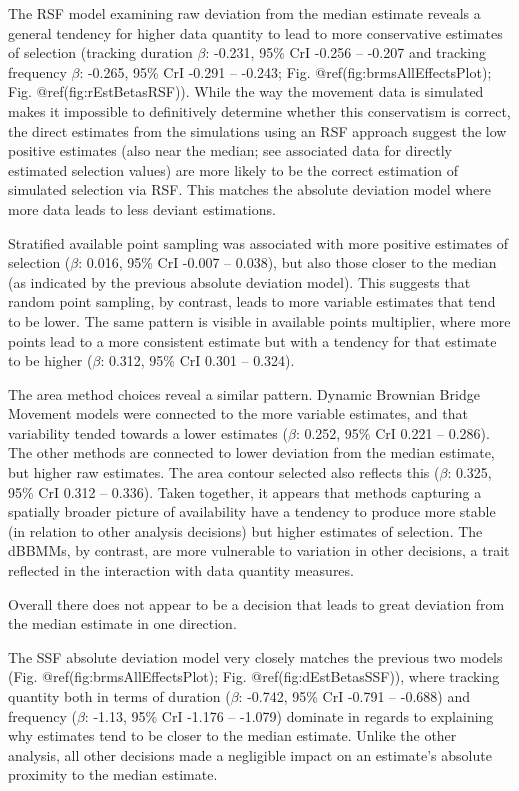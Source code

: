 \documentclass[10pt,a4paper]{article}
\begin{document}
The RSF model examining raw deviation from the median estimate reveals a general tendency for higher data quantity to lead to more conservative estimates of selection (tracking duration \(\beta\): -0.231, 95\% CrI -0.256 -- -0.207 and tracking frequency \(\beta\): -0.265, 95\% CrI -0.291 -- -0.243; Fig. @ref(fig:brmsAllEffectsPlot); Fig. @ref(fig:rEstBetasRSF)).
While the way the movement data is simulated makes it impossible to definitively determine whether this conservatism is correct, the direct estimates from the simulations using an RSF approach suggest the low positive estimates (also near the median; see associated data for directly estimated selection values) are more likely to be the correct estimation of simulated selection via RSF.
This matches the absolute deviation model where more data leads to less deviant estimations.

Stratified available point sampling was associated with more positive estimates of selection (\(\beta\): 0.016, 95\% CrI -0.007 -- 0.038), but also those closer to the median (as indicated by the previous absolute deviation model).
This suggests that random point sampling, by contrast, leads to more variable estimates that tend to be lower.
The same pattern is visible in available points multiplier, where more points lead to a more consistent estimate but with a tendency for that estimate to be higher (\(\beta\): 0.312, 95\% CrI 0.301 -- 0.324).

The area method choices reveal a similar pattern.
Dynamic Brownian Bridge Movement models were connected to the more variable estimates, and that variability tended towards a lower estimates (\(\beta\): 0.252, 95\% CrI 0.221 -- 0.286).
The other methods are connected to lower deviation from the median estimate, but higher raw estimates.
The area contour selected also reflects this (\(\beta\): 0.325, 95\% CrI 0.312 -- 0.336).
Taken together, it appears that methods capturing a spatially broader picture of availability have a tendency to produce more stable (in relation to other analysis decisions) but higher estimates of selection.
The dBBMMs, by contrast, are more vulnerable to variation in other decisions, a trait reflected in the interaction with data quantity measures.

Overall there does not appear to be a decision that leads to great deviation from the median estimate in one direction.

The SSF absolute deviation model very closely matches the previous two models (Fig. @ref(fig:brmsAllEffectsPlot); Fig. @ref(fig:dEstBetasSSF)), where tracking quantity both in terms of duration (\(\beta\): -0.742, 95\% CrI -0.791 -- -0.688) and frequency (\(\beta\): -1.13, 95\% CrI -1.176 -- -1.079) dominate in regards to explaining why estimates tend to be closer to the median estimate.
Unlike the other analysis, all other decisions made a negligible impact on an estimate's absolute proximity to the median estimate.
\end{document}
